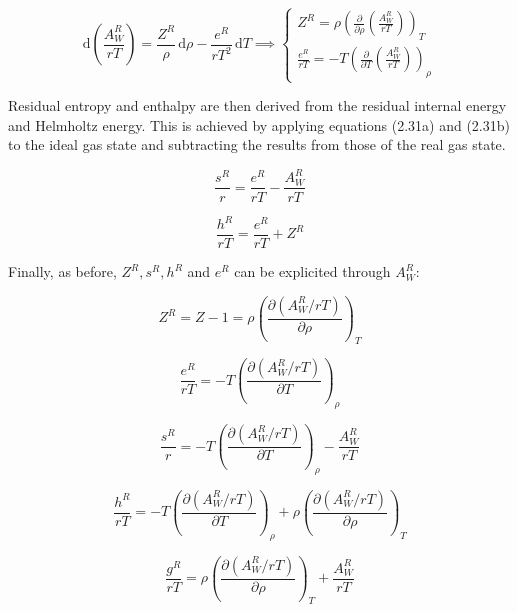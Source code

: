 \begin{equation}
\mathrm{d} \left( \frac{A_W^R}{r T} \right) = \frac{Z^R}{\rho} \, \mathrm{d}\rho - \frac{e^R}{r T^2} \, \mathrm{d}T 
\implies 
\begin{cases}
    Z^R = \rho \left( \frac{\partial}{\partial \rho} \left( \frac{A_W^R}{r T} \right) \right)_{T} \\[10pt]
    \frac{e^R}{r T} = -T \left( \frac{\partial}{\partial T} \left( \frac{A_W^R}{r T} \right) \right)_{\rho}
\end{cases}
\end{equation}

Residual entropy and enthalpy are then derived from the residual internal energy
and Helmholtz energy. This is achieved by applying equations (2.31a) and (2.31b)
to the ideal gas state and subtracting the results from those of the real gas
state.

\begin{equation}
	\frac{s^R}{r} = \frac{e^R}{rT} - \frac{A^R_W}{rT} 
\end{equation}

\begin{equation}
	\frac{h^R}{rT} = \frac{e^R}{rT} + Z^R
\end{equation}

Finally, as before, $Z^R , s^R, h^R$ and $e^R$ can be explicited through $A_W^R$:

\begin{equation}
	Z^R = Z - 1 = \rho\left(\frac{\partial(A_W^R/rT)}{\partial\rho}\right)_T
\end{equation}

\begin{equation}
	\frac{e^R}{rT} = -T \left(\frac{\partial(A_W^R/rT)}{\partial T}\right)_\rho
\end{equation}

\begin{equation}
	\frac{s^R}{r} = -T \left(\frac{\partial(A_W^R/rT)}{\partial T}\right)_\rho - \frac{A^R_W}{rT}
\end{equation}

\begin{equation}
	\frac{h^R}{rT} = -T \left(\frac{\partial(A_W^R/rT)}{\partial T}\right)_\rho + \rho\left(\frac{\partial(A^R_W/rT)}{\partial\rho}\right)_T
\end{equation}

\begin{equation}
	\frac{g^R}{rT} = \rho\left(\frac{\partial(A^R_W/rT)}{\partial\rho}\right)_T + \frac{A^R_W}{rT}
\end{equation}

